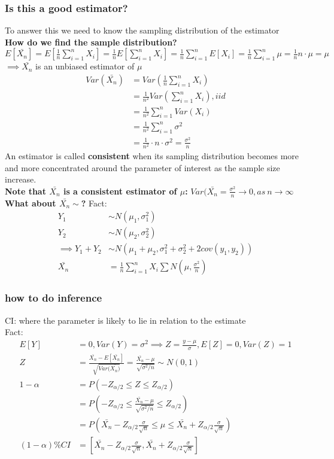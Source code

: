 \documentclass{article}
\theoremstyle{definition}
\theoremstyle{thrm}
\theoremstyle{lma}
\theoremstyle{ppst}
\theoremstyle{crlr}
\begin{document}
\subsubsection{Is this a good estimator?}
	To answer this we need to know the sampling distribution of the estimator\\
	
\textbf{How do we find the sample distribution?}\\
$E[\bar{X_n}] = E[\frac{1}{n}\sum_{i=1}^nX_i] = \frac{1}{n}E[\sum_{i=1}^nX_i] = \frac{1}{n}\sum_{i=1}^nE[X_i] = \frac{1}{n}\sum_{i=1}^n\mu = \frac{1}{n} n\cdot \mu = \mu$\\
$\implies \bar{X_n}$ is an unbiased estimator of $\mu$
\begin{align*}
	Var(\bar{X_n}) &= Var(\frac{1}{n}\sum_{i=1}^nX_i)\\
	&= \frac{1}{n^2}Var(\sum_{i=1}^nX_i), iid\\
	&= \frac{1}{n^2}\sum_{i=1}^nVar(X_i)\\
	&= \frac{1}{n^2}\sum_{i=1}^n\sigma^2\\
	&= \frac{1}{n^2}\cdot n\cdot \sigma^2 = \frac{\sigma^2}{n}
\end{align*}
An estimator is called \textbf{consistent} when its 	sampling distribution becomes more and more concentrated around the parameter of interest as the sample size increase. \\
\textbf{Note that $\bar{X_n}$ is a consistent estimator of $\mu$: }
$Var(\bar{X_n} = \frac{\sigma^2}{n} \to 0, as\  n\to \infty$\\
\textbf{What about $\bar{X_n}\sim$?}
Fact: 
\begin{align*}
	Y_1 &\sim N(\mu_1, \sigma_1^2)\\
	Y_2 &\sim N(\mu_2, \sigma_2^2)\\
	\implies Y_1+Y_2 &\sim N(\mu_1+\mu_2, \sigma_1^2+\sigma_2^2+2cov(y_1,y_2))\\
	\bar{X_n} &= \frac{1}{n}\sum_{i=1}^nX_i \sum N(\mu, \frac{\sigma^2}{n})
\end{align*}
\subsubsection{how to do inference}
CI: where the parameter is likely to lie in relation to the estimate\\
Fact:
\begin{align*}
	E[Y]&=0,Var(Y) = \sigma^2 \implies Z = \frac{y-\mu}{\sigma}, E[Z] = 0, Var(Z) = 1\\
	Z &= \frac{\bar{X_n}-E[\bar{X_n}]}{\sqrt{Var(\bar{X_n)}}} = \frac{\bar{X_n}-\mu}{\sqrt{\sigma^2/n}}\sim N(0,1)\\
	1-\alpha &=P(-Z_{\alpha/2} \leq Z \leq Z_{\alpha/2})\\
	&= P(-Z_{\alpha/2} \leq \frac{\bar{X_n}-\mu}{\sqrt{\sigma^2/n}} \leq Z_{\alpha/2})\\
	&= P(\bar{X_n}-Z_{\alpha/2}\frac{\sigma}{\sqrt{n}} \leq \mu \leq \bar{X_n}+Z_{\alpha/2}\frac{\sigma}{\sqrt{n}})\\
	(1-\alpha)\% CI &= [\bar{X_n}-Z_{\alpha/2}\frac{\sigma}{\sqrt{n}} ,\bar{X_n}+Z_{\alpha/2}\frac{\sigma}{\sqrt{n}}]
\end{align*}
\end{document}
